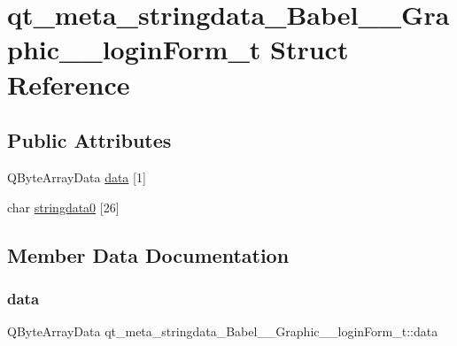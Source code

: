 \hypertarget{structqt__meta__stringdata__Babel____Graphic____loginForm__t}{}\section{qt\+\_\+meta\+\_\+stringdata\+\_\+\+Babel\+\_\+\+\_\+\+Graphic\+\_\+\+\_\+login\+Form\+\_\+t Struct Reference}
\label{structqt__meta__stringdata__Babel____Graphic____loginForm__t}
\subsection*{Public Attributes}
\begin{DoxyCompactItemize}
\item 
Q\+Byte\+Array\+Data \hyperlink{structqt__meta__stringdata__Babel____Graphic____loginForm__t_af235d3bee4f31b3db247e79fbe40c7b2}{data} \mbox{[}1\mbox{]}
\item 
char \hyperlink{structqt__meta__stringdata__Babel____Graphic____loginForm__t_af27833dd6c2440fcf31eeecdc7ecc10d}{stringdata0} \mbox{[}26\mbox{]}
\end{DoxyCompactItemize}


\subsection{Member Data Documentation}
\mbox{\label{structqt__meta__stringdata__Babel____Graphic____loginForm__t_af235d3bee4f31b3db247e79fbe40c7b2}} 
\subsubsection{\texorpdfstring{data}{data}}
{\footnotesize\ttfamily Q\+Byte\+Array\+Data qt\+\_\+meta\+\_\+stringdata\+\_\+\+Babel\+\_\+\+\_\+\+Graphic\+\_\+\+\_\+login\+Form\+\_\+t\+::data}

